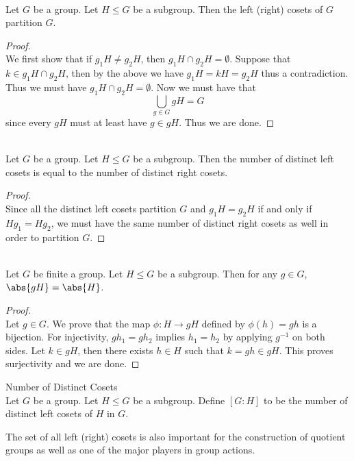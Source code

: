\documentclass[a4paper]{article}
\begin{document}
\begin{prp}{}{}\\
Let $G$ be a group. Let $H\leq G$ be a subgroup. Then the left (right) cosets of $G$ partition $G$. 
\begin{proof}\\
We first show that if $g_1H\neq g_2H$, then $g_1H\cap g_2H=\emptyset$. Suppose that $k\in g_1H\cap g_2H$, then by the above we have $g_1H=kH=g_2H$ thus a contradiction. Thus we must have $g_1H\cap g_2H=\emptyset$. Now we must have that $$\bigcup_{g\in G}gH=G$$ since every $gH$ must at least have $g\in gH$. Thus   we are done. 
\end{proof}
\end{prp}

\begin{prp}{}{}\\
Let $G$ be a group. Let $H\leq G$ be a subgroup. Then the number of distinct left cosets is equal to the number of distinct right cosets. 
\begin{proof}\\
Since all the distinct left cosets partition $G$ and $g_1H=g_2H$ if and only if $Hg_1=Hg_2$, we must have the same number of distinct right cosets as well in order to partition $G$. 
\end{proof}
\end{prp}

\begin{prp}{}{}\\
Let $G$ be finite a group. Let $H\leq G$ be a subgroup. Then for any $g\in G$, $\abs{gH}=\abs{H}$. 
\begin{proof}\\
Let $g\in G$. We prove that the map $\phi:H\to gH$ defined by $\phi(h)=gh$ is a bijection. For injectivity, $gh_1=gh_2$ implies $h_1=h_2$ by applying $g^{-1}$ on both sides. Let $k\in gH$, then there exists $h\in H$ such that $k=gh\in gH$. This proves surjectivity and we are done. 
\end{proof}
\end{prp}

\begin{defn}{Number of Distinct Cosets}{}\\
Let $G$ be a group. Let $H\leq G$ be a subgroup. Define $[G:H]$ to be the number of distinct left cosets of $H$ in $G$. 
\end{defn}

The set of all left (right) cosets is also important for the construction of quotient groups as well as one of the major players in group actions. 
\end{document}
